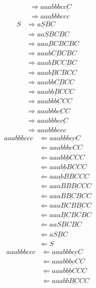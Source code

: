 \documentclass[a4paper, twocolumn]{ctexart}
\newcommand{\tto}{\Rightarrow}
\newcommand{\ffrom}{\Leftarrow}
\begin{document}
\begin{outline}[enumerate]
\begin{align*}
          & \tto aaabbbc\underline{cC} \\
          & \tto aaabbbccc
    \end{align*}
    \begin{align*}
        S & \tto a\underline{S}BC \\
          & \tto aa\underline{S}BCBC \\
          & \tto aa\underline{aB}CBCBC \\
          & \tto aaab\underline{CB}CBC \\
          & \tto aaabBC\underline{CB}C \\
          & \tto aaa\underline{bB}CBCC \\
          & \tto aaabb\underline{CB}CC \\
          & \tto aaab\underline{bB}CCC \\
          & \tto aaabb\underline{bC}CC \\
          & \tto aaabbb\underline{cC}C \\
          & \tto aaabbbc\underline{cC} \\
          & \tto aaabbbccc
    \end{align*}
    \begin{align*}
        aaabbbccc  & \ffrom aaabbb\underline{cc}C \\
        & \ffrom aaabb\underline{bc}CC \\
        & \ffrom aaab\underline{bb}CCC \\
        & \ffrom aaa\underline{bb}BCCC \\
        & \ffrom aa\underline{ab}BBCCC \\
        & \ffrom aaaBB\underline{BC}CC \\
        & \ffrom aaaB\underline{BC}BCC \\
        & \ffrom aaaBCB\underline{BC}C \\
        & \ffrom aa\underline{aBC}BCBC \\
        & \ffrom a\underline{aSBC}BC \\
        & \ffrom \underline{aSBC} \\
        & \ffrom S
    \end{align*}
    \begin{align*}
        aaabbbccc  & \ffrom aaabbb\underline{cc}C \\
        & \ffrom aaabb\underline{bc}CC \\
        & \ffrom aaab\underline{bb}CCC \\
        & \ffrom aaabb\underline{BC}CC \\

\end{align*}
\end{outline}
\end{document}
